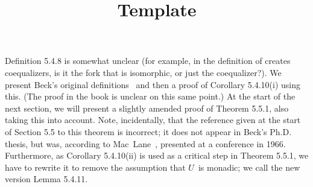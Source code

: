 \documentclass[../../solutions]{subfiles}
\title{Template}
\author{}
\begin{document}
\maketitle

%
\label{def:5.4.8}
Definition 5.4.8 is somewhat unclear (for example, in the definition
of creates coequalizers, is it the fork that is isomorphic, or just
the coequalizer?).  We present Beck's original definitions~\cite{beck}
and then a proof of Corollary 5.4.10(i) using this.  (The proof in the
book is unclear on this same point.)  At the start of the next
section, we will present a slightly amended proof of Theorem 5.5.1,
also taking this into account.  Note, incidentally, that the reference
given at the start of Section 5.5 to this theorem is incorrect; it
does not appear in Beck's Ph.D. thesis, but was, according to
Mac~Lane~\cite[159]{catworking}, presented at a conference in 1966.
Furthermore, as Corollary 5.4.10(ii) is used as a critical step in
Theorem 5.5.1, we have to rewrite it to remove the assumption that
$U$~is monadic; we call the new version Lemma 5.4.11.
\end{document}

